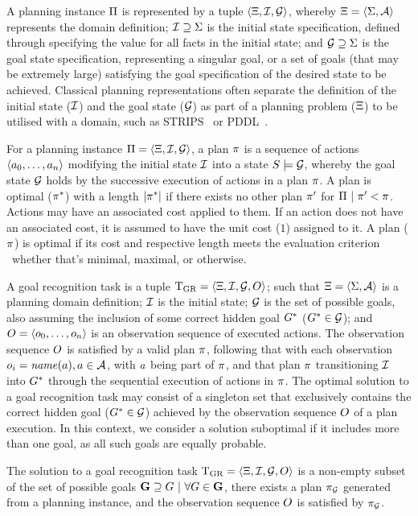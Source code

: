 A planning instance $\Pi$ is represented by a tuple $\left\langle\Xi,\mathcal{I},\mathcal{G}\right\rangle$, whereby $\Xi=\left\langle\Sigma,\mathcal{A}\right\rangle$ represents the domain definition; $\mathcal{I}\supseteq\Sigma$ is the initial state specification, defined through specifying the value for all facts in the initial state; and $\mathcal{G}\supseteq\Sigma$ is the goal state specification, representing a singular goal, or a set of goals (that may be extremely large) satisfying the goal specification of the desired state to be achieved.
Classical planning representations often separate the definition of the initial state ($\mathcal{I}$) and the goal state ($\mathcal{G}$) as part of a planning problem ($\Xi$) to be utilised with a domain, such as STRIPS~\cite{Fikes1971} or PDDL~\cite{PDDL1998}.

For a planning instance $\Pi=\left\langle\Xi,\mathcal{I},\mathcal{G}\right\rangle$, a plan $\pi$ is a sequence of actions $\left\langle a_0,\dots,a_n\right\rangle$ modifying the initial state $\mathcal{I}$ into a state $S\models\mathcal{G}$, whereby the goal state $\mathcal{G}$ holds by the successive execution of actions in a plan $\pi$. A plan is optimal ($\pi^{*}$) with a length $\vert\pi^{*}\vert$ if there exists no other plan $\pi'$ for $\Pi~\vert~ \pi'<\pi$.
Actions may have an associated cost applied to them. If an action does not have an associated cost, it is assumed to  have the unit cost ($1$) assigned to it. 
A plan ($\pi$) is optimal if its cost and respective length meets the evaluation criterion \textemdash~whether that's minimal, maximal, or otherwise.

A goal recognition task is a tuple $\text{T}_{\text{GR}}=\left\langle\Xi,\mathcal{I},\mathcal{G},O\right\rangle$; such that $\Xi=\left\langle\Sigma,\mathcal{A}\right\rangle$ is a planning domain definition; $\mathcal{I}$ is the initial state; $\mathcal{G}$ is the set of possible goals, also assuming the inclusion of some correct hidden goal $G^{*}$ ($G^{*}\in\mathcal{G}$); and $O=\left\langle o_0,\dots,o_n\right\rangle$ is an observation sequence of executed actions. The observation sequence $O$ is satisfied by a valid plan $\pi$, following that with each observation $o_i=\mathit{name}(a), a\in\mathcal{A}$, with $a$ being part of $\pi$, and that plan $\pi$ transitioning $\mathcal{I}$ into $G^{*}$ through the sequential execution of actions in $\pi$.
The optimal solution to a goal recognition task may consist of a singleton set that exclusively contains the correct hidden goal ($G^{*}\in\mathcal{G}$) achieved by the observation sequence $O$ of a plan execution.  In this context, we consider a solution suboptimal if it includes more than one goal, as all such goals are equally probable.

The solution to a goal recognition task $\text{T}_{\text{GR}}=\left\langle\Xi,\mathcal{I},\mathcal{G},O\right\rangle$ is a non-empty subset of the set of possible goals $\textbf{G}\supseteq G~\vert~\forall G\in\textbf{G}$, there exists a plan $\pi_{\mathcal{G}}$ generated from a planning instance, and the observation sequence $O$ is satisfied by $\pi_{\mathcal{G}}$.